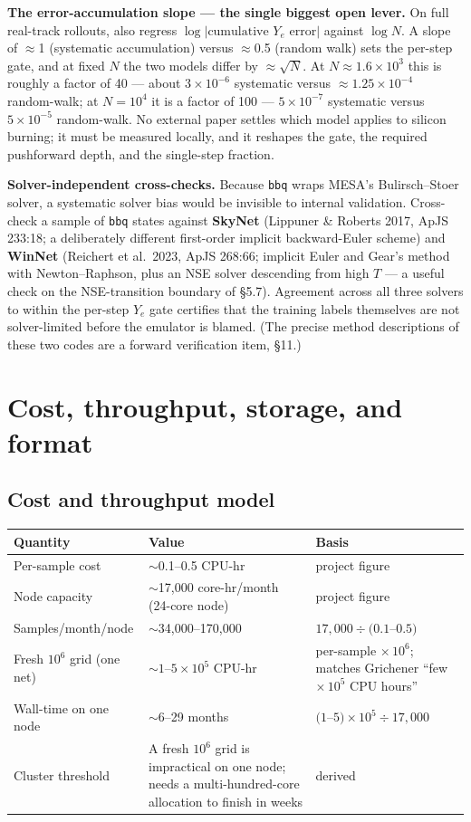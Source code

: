 \documentclass[11pt]{article}
\newcommand{\bbq}{\texttt{bbq}}
\begin{document}
\textbf{The error-accumulation slope --- the single biggest open lever.} On full real-track rollouts, also regress $\log|\text{cumulative } Y_e \text{ error}|$ against $\log N$. A slope of $\approx$1 (systematic accumulation) versus $\approx$0.5 (random walk) sets the per-step gate, and at fixed $N$ the two models differ by $\approx\sqrt{N}$. At $N \approx 1.6\times 10^3$ this is roughly a factor of 40 --- about $3\times 10^{-6}$ systematic versus $\approx 1.25\times 10^{-4}$ random-walk; at $N = 10^4$ it is a factor of 100 --- $5\times 10^{-7}$ systematic versus $5\times 10^{-5}$ random-walk. No external paper settles which model applies to silicon burning; it must be measured locally, and it reshapes the gate, the required pushforward depth, and the single-step fraction.

\textbf{Solver-independent cross-checks.} Because \bbq{} wraps MESA's Bulirsch--Stoer solver, a systematic solver bias would be invisible to internal validation. Cross-check a sample of \bbq{} states against \textbf{SkyNet} (Lippuner \& Roberts 2017, ApJS 233:18; a deliberately different first-order implicit backward-Euler scheme) and \textbf{WinNet} (Reichert et al.\ 2023, ApJS 268:66; implicit Euler and Gear's method with Newton--Raphson, plus an NSE solver descending from high $T$ --- a useful check on the NSE-transition boundary of \S5.7). Agreement across all three solvers to within the per-step $Y_e$ gate certifies that the training labels themselves are not solver-limited before the emulator is blamed. (The precise method descriptions of these two codes are a forward verification item, \S11.)

\section{Cost, throughput, storage, and format}

\subsection{Cost and throughput model}

{\small\setlength{\tabcolsep}{5pt}
\begin{longtable}{p{3.5cm}p{5.0cm}p{6.4cm}}
\toprule
\textbf{Quantity} & \textbf{Value} & \textbf{Basis} \\
\midrule
\endhead
Per-sample cost & $\sim$0.1--0.5 CPU-hr & project figure \\
Node capacity & $\sim$17,000 core-hr/month (24-core node) & project figure \\
Samples/month/node & $\sim$34,000--170,000 & $17{,}000 \div (0.1$--$0.5)$ \\
Fresh $10^6$ grid (one net) & $\sim 1$--$5\times 10^5$ CPU-hr & per-sample $\times\, 10^6$; matches Grichener ``few $\times\,10^5$ CPU hours'' \\
Wall-time on one node & $\sim$6--29 months & $(1$--$5)\times 10^5 \div 17{,}000$ \\
Cluster threshold & A fresh $10^6$ grid is impractical on one node; needs a multi-hundred-core allocation to finish in weeks & derived \\
\bottomrule
\end{longtable}}
\end{document}
